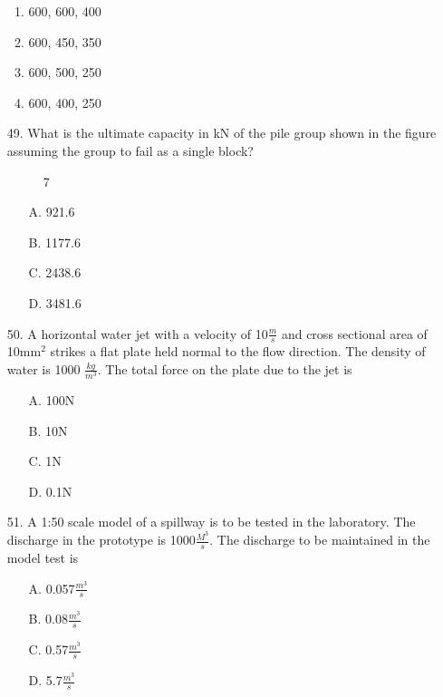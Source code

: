 \documentclass[journal]{IEEEtran}
\begin{document}
\begin{enumerate}
  \begin{enumerate}[label=\Alph*]
      \item 600, 600, 400
      \item 600, 450, 350
      \item 600, 500, 250
      \item 600, 400, 250
  \end{enumerate}
  \item [49.] What is the ultimate capacity in kN of the pile group shown in the figure
  assuming the group to fail as a single block? 
  \begin{figure}[!ht]
    \centering
    \caption{7 }
    \label{fig:7}
  \end{figure}
  \begin{enumerate}
    \item [A.] 921.6
    \item [B.] 1177.6
    \item [C.] 2438.6
    \item [D.] 3481.6
  \end{enumerate}
  \item [50.] A horizontal water jet with a velocity of 10$\frac{m}{s}$ and cross sectional area of 10mm$^2$
  strikes a flat plate held normal to the flow direction. The density of water is 1000
  $\frac{kg}{m^3}$. The total force on the plate due to the jet is 
  \begin{enumerate}
    \item [A.] 100N
    \item [B.] 10N 
    \item [C.] 1N 
    \item [D.] 0.1N 
  \end{enumerate}
  \item [51.] A 1:50 scale model of a spillway is to be tested in the laboratory. The discharge in
  the prototype is 1000$\frac{M^3}{s}$. The discharge to be maintained in the model test is 
  \begin{enumerate}
    \item [A.] 0.057$\frac{m^3}{s}$ 
    \item [B.] 0.08$\frac{m^3}{s}$
    \item [C.] 0.57$\frac{m^3}{s}$ 
    \item [D.] 5.7$\frac{m^3}{s}$
  \end{enumerate}
\end{enumerate}

\end{document}
